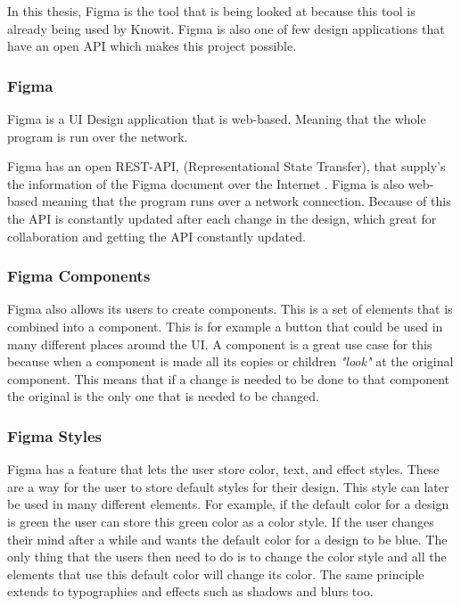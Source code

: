 In this thesis, Figma is the tool that is being looked at because this tool is already being used by Knowit. Figma is also one of few design applications that have an open API which makes this project possible. 

 






\subsubsection{Figma}%
\label{sub:Figma}
Figma is a UI Design application that is web-based. Meaning that the whole program is run over the network. 

Figma has an open REST-API, (Representational State Transfer), that supply's the information of the Figma document over the Internet \cite{figmaFigma, RepresentationalStateTransfer2021}. Figma is also web-based meaning that the program runs over a network connection. Because of this the API is constantly updated after each change in the design, which great for collaboration and getting the API constantly updated.

\subsubsection{Figma Components}%
\label{ssub:Figma Components}

Figma also allows its users to create components. This is a set of elements that is combined into a component. This is for example a button that could be used in many different places around the UI. A component is a great use case for this because when a component is made all its copies or children \textit{"look"} at the original component. This means that if a change is needed to be done to that component the original is the only one that is needed to be changed.

\subsubsection{Figma Styles}%
\label{ssub:Styles}
Figma has a feature that lets the user store color, text, and effect styles. These are a way for the user to store default styles for their design. This style can later be used in many different elements. For example, if the default color for a design is green the user can store this green color as a color style. If the user changes their mind after a while and wants the default color for a design to be blue. The only thing that the users then need to do is to change the color style and all the elements that use this default color will change its color. The same principle extends to typographies and effects such as shadows and blurs too. 





